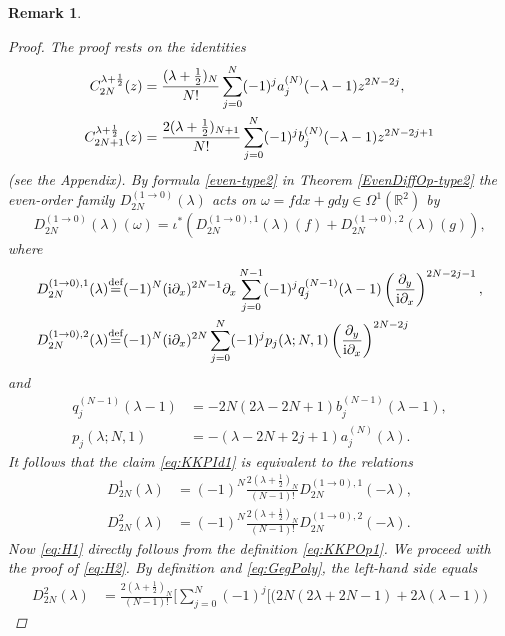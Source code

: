 \documentclass[a4paper,12pt,reqno]{amsart}
\newtheorem{bem}[theorem]{Remark}
\numberwithin{theorem}{subsection}
\numberwithin{equation}{section}
\begin{document}
\begin{bem}
\begin{proof} The proof rests on the identities
\begin{align}
   C_{2N}^{\lambda+\frac 12}(z)
   &=\frac{(\lambda+\frac 12)_N}{N!}\sum_{j=0}^N (-1)^j a_j^{(N)}(-\lambda-1) z^{2N-2j},\notag\\
   C_{2N+1}^{\lambda+\frac 12}(z)
   &=\frac{2(\lambda+\frac 12)_{N+1}}{N!}\sum_{j=0}^N (-1)^j b_j^{(N)}(-\lambda-1) z^{2N-2j+1} \label{eq:GegPoly}
\end{align}
(see the Appendix). By formula \eqref{even-type2} in Theorem
\ref{EvenDiffOp-type2} the even-order family $D_{2N}^{(1\to 0)}(\lambda)$ acts
on $\omega = f dx + g dy \in \Omega^1({\mathbb{R}}^2)$ by
\begin{equation*}
   D^{(1\to 0)}_{2N}(\lambda)(\omega) = \iota^*(D^{(1\to 0),1}_{2N}(\lambda)(f)+D^{(1\to 0),2}_{2N}(\lambda)(g)),
\end{equation*}
where
\begin{align*}
   D^{(1\to 0),1}_{2N}(\lambda) & {\stackrel{\text{def}}{=}} (-1)^{N} ({\rm i}\partial_x)^{2N-1}\partial_x
   \sum_{j=0}^{N-1} (-1)^j q^{(N-1)}_j(\lambda-1) \left(\frac{\partial_y}{{\rm i}\partial_x}\right)^{2N-2j-1}, \\
   D^{(1\to 0),2}_{2N}(\lambda) & {\stackrel{\text{def}}{=}} (-1)^{N}({\rm i}\partial_x)^{2N}
   \sum_{j=0}^N (-1)^j p_j(\lambda;N,1) \left(\frac{\partial_y}{{\rm i}\partial_x}\right)^{2N-2j}
\end{align*}
and
\begin{align*}
   q^{(N-1)}_j(\lambda\!-\!1) & = -2N(2\lambda\!-\!2N\!+\!1) b^{(N-1)}_j(\lambda-1),\\
   p_j(\lambda;N,1) & =-(\lambda\!-\!2N\!+\!2j\!+\!1) a_j^{(N)}(\lambda).
\end{align*}
It follows that the claim \eqref{eq:KKPId1} is equivalent to the relations
\begin{align}
   D^1_{2N}(\lambda) & =(-1)^N \frac{2 (\lambda+\frac 12)_N}{(N-1)!}
   D^{(1\to 0),1}_{2N}(-\lambda), \label{eq:H1} \\
   D^2_{2N}(\lambda) & =(-1)^N \frac{2 (\lambda+\frac 12)_N}{(N-1)!}
   D^{(1\to 0),2}_{2N}(-\lambda). \label{eq:H2}
\end{align}
Now \eqref{eq:H1} directly follows from the definition \eqref{eq:KKPOp1}. We
proceed with the proof of \eqref{eq:H2}. By definition and \eqref{eq:GegPoly},
the left-hand side equals
\begin{align*}
   D^2_{2N}(\lambda) & = \frac{2(\lambda\!+\!\frac 12)_N}{(N\!-\!1)!} \Bigg[
   \sum_{j=0}^{N}(-1)^j \Big[\big(2N(2\lambda\!+\!2N\!-\!1)+2\lambda(\lambda\!-\!1)\big)

\end{align*}
\end{proof}
\end{bem}
\end{document}
